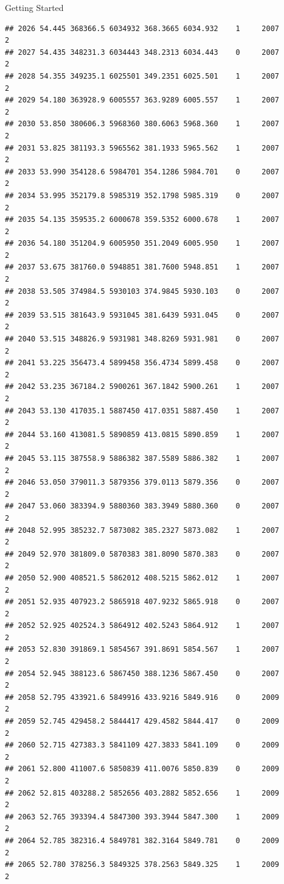 \documentclass[
  ignorenonframetext,
]{beamer}
\begin{document}
\begin{frame}[fragile]{Getting Started}
\begin{verbatim}
## 2026 54.445 368366.5 6034932 368.3665 6034.932    1     2007        2
## 2027 54.435 348231.3 6034443 348.2313 6034.443    0     2007        2
## 2028 54.355 349235.1 6025501 349.2351 6025.501    1     2007        2
## 2029 54.180 363928.9 6005557 363.9289 6005.557    1     2007        2
## 2030 53.850 380606.3 5968360 380.6063 5968.360    1     2007        2
## 2031 53.825 381193.3 5965562 381.1933 5965.562    1     2007        2
## 2033 53.990 354128.6 5984701 354.1286 5984.701    0     2007        2
## 2034 53.995 352179.8 5985319 352.1798 5985.319    0     2007        2
## 2035 54.135 359535.2 6000678 359.5352 6000.678    1     2007        2
## 2036 54.180 351204.9 6005950 351.2049 6005.950    1     2007        2
## 2037 53.675 381760.0 5948851 381.7600 5948.851    1     2007        2
## 2038 53.505 374984.5 5930103 374.9845 5930.103    0     2007        2
## 2039 53.515 381643.9 5931045 381.6439 5931.045    0     2007        2
## 2040 53.515 348826.9 5931981 348.8269 5931.981    0     2007        2
## 2041 53.225 356473.4 5899458 356.4734 5899.458    0     2007        2
## 2042 53.235 367184.2 5900261 367.1842 5900.261    1     2007        2
## 2043 53.130 417035.1 5887450 417.0351 5887.450    1     2007        2
## 2044 53.160 413081.5 5890859 413.0815 5890.859    1     2007        2
## 2045 53.115 387558.9 5886382 387.5589 5886.382    1     2007        2
## 2046 53.050 379011.3 5879356 379.0113 5879.356    0     2007        2
## 2047 53.060 383394.9 5880360 383.3949 5880.360    0     2007        2
## 2048 52.995 385232.7 5873082 385.2327 5873.082    1     2007        2
## 2049 52.970 381809.0 5870383 381.8090 5870.383    0     2007        2
## 2050 52.900 408521.5 5862012 408.5215 5862.012    1     2007        2
## 2051 52.935 407923.2 5865918 407.9232 5865.918    0     2007        2
## 2052 52.925 402524.3 5864912 402.5243 5864.912    1     2007        2
## 2053 52.830 391869.1 5854567 391.8691 5854.567    1     2007        2
## 2054 52.945 388123.6 5867450 388.1236 5867.450    0     2007        2
## 2058 52.795 433921.6 5849916 433.9216 5849.916    0     2009        2
## 2059 52.745 429458.2 5844417 429.4582 5844.417    0     2009        2
## 2060 52.715 427383.3 5841109 427.3833 5841.109    0     2009        2
## 2061 52.800 411007.6 5850839 411.0076 5850.839    0     2009        2
## 2062 52.815 403288.2 5852656 403.2882 5852.656    1     2009        2
## 2063 52.765 393394.4 5847300 393.3944 5847.300    1     2009        2
## 2064 52.785 382316.4 5849781 382.3164 5849.781    0     2009        2
## 2065 52.780 378256.3 5849325 378.2563 5849.325    1     2009        2

\end{verbatim}
\end{frame}
\end{document}
